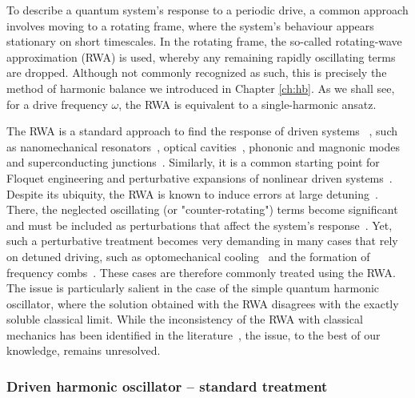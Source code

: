 To describe a quantum system's response to a periodic drive, a common approach involves moving to a rotating frame, where the system’s behaviour appears stationary on short timescales. In the rotating frame, the so-called rotating-wave approximation (RWA) is used, whereby any remaining rapidly oscillating terms are dropped. Although not commonly recognized as such, this is precisely the method of harmonic balance we introduced in Chapter \ref{ch:hb}. As we shall see, for a drive frequency $\omega$, the RWA is equivalent to a single-harmonic ansatz.


The RWA is a standard approach to find the response of driven systems 
~\cite{Lorch_2018, Lorch_2019}, such
as nanomechanical resonators~\cite{Bachtold_2022, Heugel_2019, Rocheleau_2010}, optical cavities~\cite{Munoz_2021, Rota_2019, Quach_2022, Ferri_2021, Soriente_2021, Soriente_2020, Delpino_2016}, phononic and magnonic modes~\cite{Xu_2021, Delpino_2021, Li_2021, Qi_2021, Gonzalez-Ballestero_2022, Fukami_2021, Marsh_2021} and superconducting junctions~\cite{Blais_2021, Gu_2017, Xiang_2013}. Similarly, it is a common starting point for Floquet engineering and perturbative expansions of nonlinear driven systems~\cite{Mikami2016, Eckardt2017,Eckardt2015,Bukov2015,Goldman2014}.
Despite its ubiquity, the RWA is known to induce errors at large detuning~\cite{Ann_2021}. There, the neglected oscillating (or "counter-rotating") terms become significant and must be included as perturbations that affect the system's response~\cite{Zheng_2008, Gan_2010, Zhang_2015, Zeuch_2020, Zueco_2009, Wang_2021, Wang_2015, He_2012, Hausinger_2008}. Yet, such a perturbative treatment becomes very demanding in many cases that rely on detuned driving, such as optomechanical cooling~\cite{Liu_2013, Marquardt_2008} and the formation of frequency combs~\cite{Weng_2022, Herr_2012, Chembo_2016, Lugiato_1987, Lugiato_2018}. These cases are therefore commonly treated
using the RWA. The issue
is particularly salient in the case of the simple quantum harmonic
oscillator, where the solution obtained with the RWA disagrees
with the exactly soluble classical limit. While the inconsistency of the RWA with classical mechanics has been
identified in the literature~\cite{Ford_1996}, the issue, to the best of our knowledge, remains unresolved. 


\subsubsection{Driven harmonic oscillator -- standard treatment}

